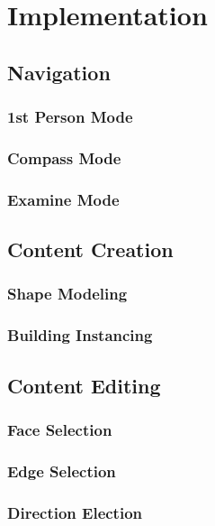 \chapter{Implementation}



\section{Navigation}

\subsection{1st Person Mode}

\subsection{Compass Mode}

\subsection{Examine Mode}


\section{Content Creation}

\subsection{Shape Modeling}

\subsection{Building Instancing}


\section{Content Editing}

\subsection{Face Selection}

\subsection{Edge Selection}

\subsection{Direction Election}


